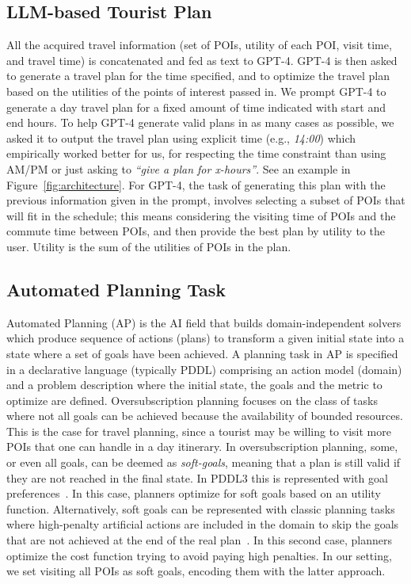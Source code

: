\documentclass[letterpaper]{article}
\newcommand{\gpt}{{\sc GPT-4}\xspace}
\begin{document}
\subsection{LLM-based Tourist Plan}
All the acquired travel information (set of POIs, utility of each POI, visit time, and travel time) is concatenated  and fed as text to \gpt. \gpt is then asked to generate a travel plan for the time specified, and to optimize the travel plan based on the utilities of the points of interest passed in. We prompt \gpt to generate a day travel plan for a fixed amount of time indicated with start and end hours. To help \gpt generate valid plans in as many cases as possible, we asked it to output the travel plan using explicit time (e.g., \textit{14:00}) which empirically worked better for us, for respecting the time constraint than using AM/PM or just asking to \textit{``give a plan for x-hours''}. See an example in Figure~\ref{fig:architecture}.
For \gpt, the task of generating this plan with the previous information given in the prompt, involves selecting a subset of POIs that will fit in the schedule; this means considering the visiting time of POIs and the commute time between POIs, and then provide the best plan by utility to the user. Utility is the sum of the utilities of POIs in the plan.

\subsection{Automated Planning Task}

Automated Planning (AP) is the AI field that builds domain-independent solvers which produce sequence of actions (plans) to transform a given initial state into a  state where a set of goals have been achieved. A planning task in AP is  specified in a declarative language (typically PDDL) comprising an action model (domain) and a problem description where the initial state, the goals and the metric to optimize are defined. Oversubscription planning focuses on the class of tasks where not all goals can be achieved because the availability of bounded resources. This is the case for travel planning, since a tourist may be willing to visit more POIs that one can handle in a day itinerary. In oversubscription planning, some, or even all goals, can be deemed as \textit{soft-goals}, meaning that a plan is still valid if they are not reached in the final state. In PDDL3 this is represented with goal preferences~\cite{PDDL30}. In this case, planners  optimize for soft goals based on an utility function. Alternatively, soft goals
can be represented with classic planning tasks where high-penalty artificial 
actions are included in the domain to skip the goals that are not achieved at the end of the real plan~\cite{keyder2009soft}.  In this second case, planners optimize the cost function trying to avoid paying high penalties. 
In our setting, we set visiting all POIs as soft goals, encoding them with the latter approach.
\end{document}
